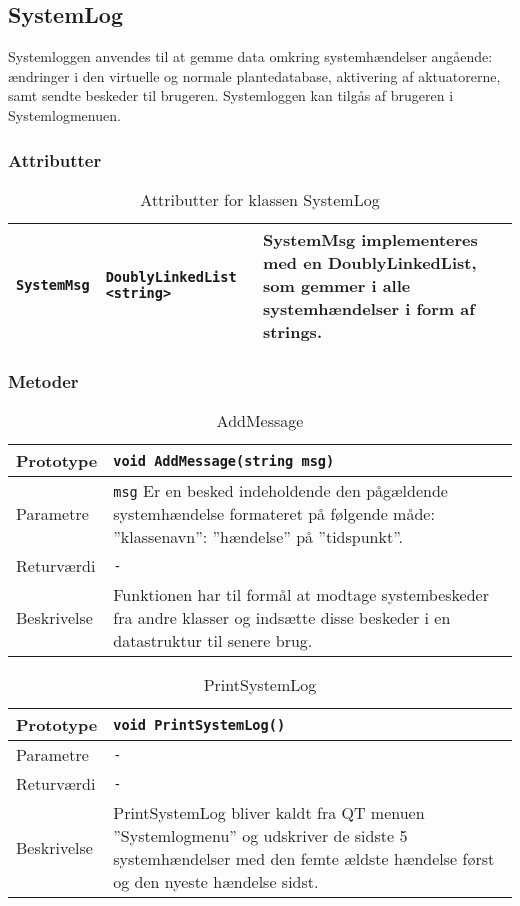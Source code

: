 \subsection{SystemLog}

Systemloggen anvendes til at gemme data omkring systemhændelser angående: ændringer i den virtuelle og normale plantedatabase, aktivering af aktuatorerne, samt sendte beskeder til brugeren. Systemloggen kan tilgås af brugeren i Systemlogmenuen.


\subsubsection{Attributter}

\begin{table}[h]
\begin{tabularx}{\textwidth}{| L{2.5cm} | l | Z |} \hline
\texttt{SystemMsg} & \texttt{DoublyLinkedList <string> } & SystemMsg implementeres med en DoublyLinkedList, som gemmer i alle systemhændelser i form af strings.  \\\hline
\end{tabularx}
\caption{Attributter for klassen SystemLog}
\label{table:SystemLog_attributter}
\end{table}

\subsubsection{Metoder}

\begin{table}[h]
\begin{tabularx}{\textwidth}{| L{2.5 cm} | Z |} \hline
Prototype & \texttt{void AddMessage(string msg)} \\\hline
Parametre & \texttt{msg} \newline
Er en besked indeholdende den pågældende systemhændelse formateret på følgende måde: ”klassenavn”: ”hændelse” på ”tidspunkt”. \\\hline
Returværdi & \texttt{-} \\\hline
Beskrivelse & Funktionen har til formål at modtage systembeskeder fra andre klasser og indsætte disse beskeder i en datastruktur til senere brug. \\\hline
\end{tabularx}
\caption{AddMessage}
\label{table:SystemLog_AddMessage}
\end{table}

\begin{table}[h]
\begin{tabularx}{\textwidth}{| L{2.5 cm} | Z |} \hline
Prototype & \texttt{void PrintSystemLog()} \\\hline
Parametre & \texttt{-} \\\hline
Returværdi & \texttt{-} \\\hline
Beskrivelse & PrintSystemLog bliver kaldt fra QT menuen ”Systemlogmenu” og udskriver de sidste 5 systemhændelser med den femte ældste hændelse først og den nyeste hændelse sidst. \\\hline
\end{tabularx}
\caption{PrintSystemLog}
\label{table:SystemLog_PrintSystemLog}
\end{table}